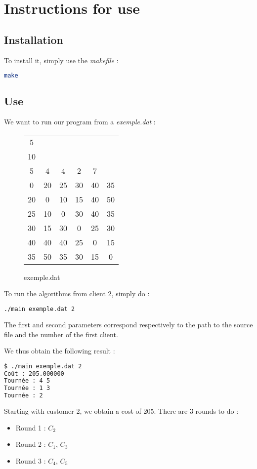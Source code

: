 \chapter{Instructions for use}

\section{Installation}

To install it, simply use the {\em makefile} :

\begin{lstlisting}[language=bash, frame=shadowbox]
make
\end{lstlisting}

\section{Use}

We want to run our program from a \textit{exemple.dat} :

\begin{figure}[!h]
\centering
\caption{exemple.dat}
\begin{tabular}{|c c c c c c|}
\hline
5	& 		 & 		& 		& 		& \\
10	& 		 & 		& 		& 		& \\
5	& 4 	 & 4 	& 2 	& 7 	& \\
0	& 20	 & 25 	& 30 	& 40 	& 35 \\
20	& 0 	 & 10 	& 15 	& 40 	& 50 \\
25	& 10	 & 0 	& 30 	& 40 	& 35 \\
30	& 15	 & 30 	& 0 	& 25 	& 30 \\
40	& 40	 & 40 	& 25 	& 0 	& 15 \\
35	& 50	 & 35	& 30 	& 15 	& 0 \\
\hline
\end{tabular}
\end{figure}

To run the algorithms from client 2, simply do :

\begin{lstlisting}[language=bash, frame=shadowbox]
./main exemple.dat 2
\end{lstlisting}

The first and second parameters correspond respectively to the path to the source file and the number of the first client.

We thus obtain the following result :

\begin{lstlisting}[language=bash, frame=shadowbox]
$ ./main exemple.dat 2
Coût : 205.000000
Tournée : 4 5
Tournée : 1 3
Tournée : 2
\end{lstlisting}

Starting with customer 2, we obtain a cost of 205. There are 3 rounds to do :

\begin{itemize}
\item Round 1 : $C_2$
\item Round 2 : $C_1$, $C_3$
\item Round 3 : $C_4$, $C_5$
\end{itemize}